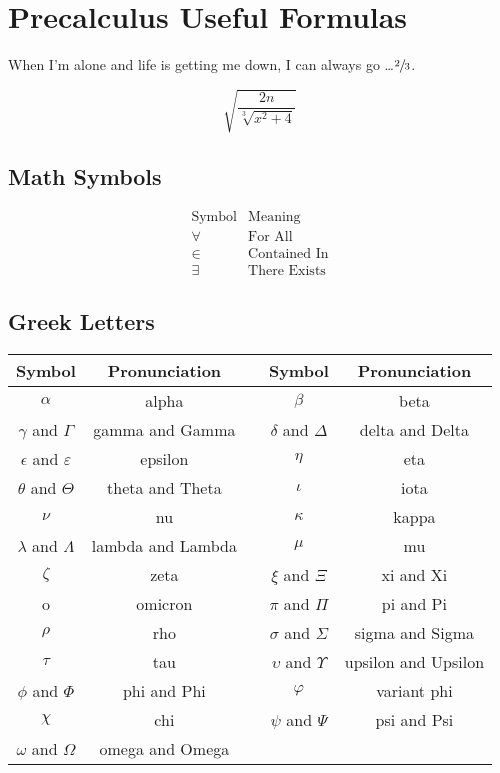 \chapter{Precalculus Useful Formulas}

When I'm alone and life is getting me down, I can always go \ldots $\sfrac{2}{3}$.

\[
    \sqrt{\frac{2n}{\sqrt[3]{x^2+4}}}
\]

\section{Math Symbols}

\begin{eqnarray*}
\textrm{Symbol} & \textrm{Meaning}\\
\forall & \textrm{For All}\\
\in  & \textrm{Contained In}\\
\exists & \textrm{There Exists}
\end{eqnarray*}


\section{Greek Letters}

\begin{tabular}{|c | c | c | c | c |}
\hline
\textbf{Symbol} & \textbf{Pronunciation} & & \textbf{Symbol} & \textbf{Pronunciation}\\
\hline
$\alpha$ & \textrm{alpha} &  & $\beta$ & \textrm{beta}\\
\hline
$\gamma$ and $\Gamma$ & \textrm{gamma and Gamma} &  & $\delta$ and $\Delta$  & \textrm{delta and Delta}\\
\hline
$\epsilon$ and $\varepsilon$ & \textrm{epsilon} &  & $\eta$ & \textrm{eta}\\
\hline
$\theta$ and $\Theta$  & \textrm{theta and Theta} &  & $\iota$ & \textrm{iota}\\
\hline
$\nu$ & \textrm{nu} &  & $\kappa$ & \textrm{kappa}\\
\hline
$\lambda$ and $\Lambda$  & \textrm{lambda and Lambda} &  & $\mu$ & \textrm{mu}\\
\hline
$\zeta$ & \textrm{zeta} &  & $\xi$ and $\Xi$ & \textrm{xi and Xi}\\
\hline
o & \textrm{omicron}  & & $\pi$ and $\Pi$ & \textrm{pi and Pi}\\
\hline
$\rho$ & \textrm{rho} &  & $\sigma$ and $\Sigma$ & \textrm{sigma and Sigma}\\
\hline
$\tau$ & \textrm{tau} &  & $\upsilon$ and $\Upsilon$ & \textrm{upsilon and Upsilon}\\
\hline
$\phi$ and $\Phi$ & \textrm{phi and Phi} &  & $\varphi$ & \textrm{variant phi}\\
\hline
$\chi$ & \textrm{chi} &  & $\psi$ and $\Psi$ & \textrm{psi and Psi}\\
\hline
$\omega$ and $\Omega$& \textrm{omega and Omega} &  & &\\
\hline
\end{tabular}
